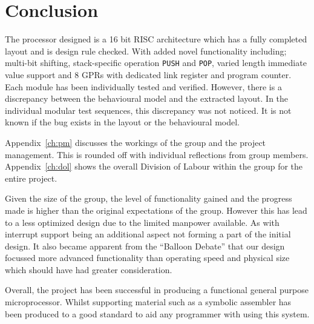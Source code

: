 

\chapter{Conclusion}

The processor designed is a 16 bit RISC architecture which has a fully completed layout and is design rule checked. 
With added novel functionality including; multi-bit shifting, stack-specific operation \texttt{PUSH} and \texttt{POP}, varied length immediate value support and 8 GPRs with dedicated link register and program counter. 
Each module has been individually tested and verified.
However, there is a discrepancy between the behavioural model and the extracted layout.
In the individual modular test sequences, this discrepancy was not noticed. 
It is not known if the bug exists in the layout or the behavioural model. 

Appendix~\ref{ch:pm} discusses the workings of the group and the project management.
This is rounded off with individual reflections from group members.
Appendix~\ref{ch:dol} shows the overall Division of Labour within the group for the entire project.

Given the size of the group, the level of functionality gained and the progress made is higher than the original expectations of the group. 
However this has lead to a less optimized design due to the limited manpower available. 
As with interrupt support being an additional aspect not forming a part of the initial design. 
It also became apparent from the ``Balloon Debate'' that our design focussed more advanced functionality than operating speed and physical size which should have had greater consideration. 

Overall, the project has been successful in producing a functional general purpose microprocessor.  
Whilst supporting material such as a symbolic assembler has been produced to a good standard to aid any programmer with using this system. 